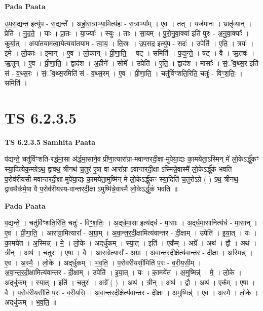 \documentclass[17pt]{extarticle}
\begin{document}
\textbf{Pada Paata} \newline

उ॒प॒स॒द्यन्त॒ इत्यु॑प - स॒द्यन्ते᳚ । अ॒हो॒रा॒त्राभ्या॒मित्य॑हः - रा॒त्राभ्या᳚म् । ए॒व । तत् । यज॑मानः । भ्रातृ॑व्यान् । प्रेति॑ । नु॒द॒ते॒ । याः । प्रा॒तः । या॒ज्याः᳚ । स्युः । ताः । सा॒यम् । पु॒रो॒नु॒वा॒क्या॑ इति॑ पुरः - अ॒नु॒वा॒क्याः᳚ । कु॒र्या॒त् । अया॑तयामत्वा॒येत्यया॑तयाम - त्वा॒य॒ । ति॒स्रः । उ॒प॒सद॒ इत्यु॑प - सदः॑ । उपेति॑ । ए॒ति॒ । त्रयः॑ । इ॒मे । लो॒काः । इ॒मान् । ए॒व । लो॒कान् । प्री॒णा॒ति॒ । षट् । समिति॑ । प॒द्य॒न्ते॒ । षट् । वै । ऋ॒तवः॑ । ऋ॒तून् । ए॒व । प्री॒णा॒ति॒ । द्वाद॑श । अ॒हीने᳚ । सोमे᳚ । उपेति॑ । ए॒ति॒ । द्वाद॑श । मासाः᳚ । सं॒ॅव॒थ्स॒र इति॑ सं - व॒थ्स॒रः । सं॒ॅव॒थ्स॒रमिति॑ सं - व॒थ्स॒रम् । ए॒व । प्री॒णा॒ति॒ । चतु॑र्विꣳशति॒रिति॒ चतुः॑ - विꣳ॒॒श॒तिः॒ । समिति॑ ।  \newline




\section*{ TS 6.2.3.5 }

\textbf{TS 6.2.3.5 } \newline
\textbf{Samhita Paata} \newline

प॑द्यन्ते॒ चतु॑र्विꣳशति-रर्द्धमा॒सा अ॑र्द्धमा॒साने॒व प्री॑णा॒त्यारा᳚ग्रा-मवान्तरदी॒क्षा-मुपे॑या॒द्यः का॒मये॑ता॒ऽस्मिन् मे॑ लो॒केऽर्द्धु॑कꣳ स्या॒दित्येक॒मग्रेऽथ॒ द्वावथ॒ त्रीनथ॑ च॒तुर॑ ए॒षा वा आरा᳚ग्रा ऽवान्तरदी॒क्षा ऽस्मिन्ने॒वास्मै॑ लो॒केऽर्द्धु॑कं भवति प॒रोव॑रीयसी-मवान्तरदी॒क्षा-मुपे॑या॒द्यः का॒मये॑ता॒मुष्मि॑न् मे लो॒केऽर्द्धु॑कꣳ स्या॒दिति॑ च॒तुरोऽग्रे ( ) ऽथ॒ त्रीनथ॒ द्वावथैक॑मे॒षा वै प॒रोव॑रीयस्य-वान्तरदी॒क्षा ऽमुष्मि॑न्ने॒वास्मै॑ लो॒केऽर्द्धु॑कं भवति ॥ \newline

\textbf{Pada Paata} \newline

प॒द्य॒न्ते॒ । चतु॑र्विꣳशति॒रिति॒ चतुः॑ - विꣳ॒॒श॒तिः॒ । अ॒द्‌र्ध॒मा॒सा इत्य॑द्‌र्ध - मा॒साः । अ॒द्‌र्ध॒मा॒सानित्य॑र्ध - मा॒सान् । ए॒व । प्री॒णा॒ति॒ । आरा᳚ग्रा॒मित्यारा᳚ - अ॒ग्रा॒म् । अ॒वा॒न्त॒र॒दी॒क्षामित्य॑वान्तर - दी॒क्षाम् । उपेति॑ । इ॒या॒त् । यः । का॒मये॑त । अ॒स्मिन्न् । मे॒ । लो॒के । अद्‌र्धु॑कम् । स्या॒त् । इति॑ । एक᳚म् । अग्रे᳚ । अथ॑ । द्वौ । अथ॑ । त्रीन् । अथ॑ । च॒तुरः॑ । ए॒षा । वै । आरा॒ग्रेत्यारा᳚ - अ॒ग्रा॒ । अ॒वा॒न्त॒र॒दी॒क्षेत्य॑वान्तर - दी॒क्षा । अ॒स्मिन्न् । ए॒व । अ॒स्मै॒ । लो॒के । अद्‌र्धु॑कम् । भ॒व॒ति॒ । प॒रोव॑रीयसी॒मिति॑ प॒रः - व॒री॒य॒सी॒म् । अ॒वा॒न्त॒र॒दी॒क्षामित्य॑वान्तर - दी॒क्षाम् । उपेति॑ । इ॒या॒त् । यः । का॒मये॑त । अ॒मुष्मिन्न्॑ । मे॒ । लो॒के । अद्‌र्धु॑कम् । स्या॒त् । इति॑ । च॒तुरः॑ । अग्रे᳚ ( ) । अथ॑ । त्रीन् । अथ॑ । द्वौ । अथ॑ । एक᳚म् । ए॒षा । वै । प॒रोव॑रीय॒सीति॑ प॒रः - व॒री॒य॒सि॒ । अ॒वा॒न्त॒र॒दी॒क्षेत्य॑वान्तर - दी॒क्षा । अ॒मुष्मिन्न्॑ । ए॒व । अ॒स्मै॒ । लो॒के । अद्‌र्धु॑कम् । भ॒व॒ति॒ ॥  \newline
\end{document}
